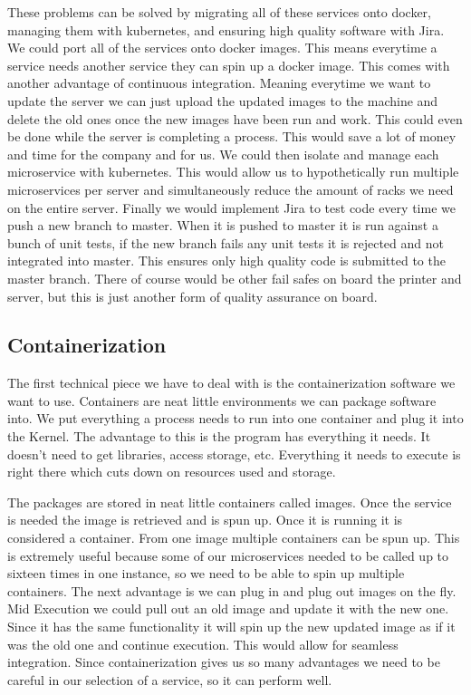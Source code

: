 \documentclass[onecolumn, draftclsnofoot,10pt, compsoc]{IEEEtran}
\begin{document}
These problems can be solved by migrating all of these services onto docker, managing them with kubernetes, and ensuring high quality software with Jira. We could port all of the services onto docker images. This means everytime a service needs another service they can spin up a docker image. This comes with another advantage of continuous integration. Meaning everytime we want to update the server we can just upload the updated images to the machine and delete the old ones once the new images have been run and work. This could even be done while the server is completing a process. This would save a lot of money and time for the company and for us. We could then isolate and manage each microservice with kubernetes. This would allow us to hypothetically run multiple microservices per server and simultaneously reduce the amount of racks we need on the entire server. Finally we would implement Jira to test code every time we push a new branch to master. When it is pushed to master it is run against a bunch of unit tests, if the new branch fails any unit tests it is rejected and not integrated into master. This ensures only high quality code is submitted to the master branch. There of course would be other fail safes on board the printer and server, but this is just another form of quality assurance on board.

\subsection{Containerization}

The first technical piece we have to deal with is the containerization software we want to use. Containers are neat little environments we can package software into. We put everything a process needs to run into one container and plug it into the Kernel. The advantage to this is the program has everything it needs. It doesn’t need to get libraries, access storage, etc. Everything it needs to execute is right there which cuts down on resources used and storage. 

The packages are stored in neat little containers called images. Once the service is needed the image is retrieved and is spun up. Once it is running it is considered a container. From one image multiple containers can be spun up. This is extremely useful because some of our microservices needed to be called up to sixteen times in one instance, so we need to be able to spin up multiple containers. The next advantage is we can plug in and plug out images on the fly. Mid Execution we could pull out an old image and update it with the new one. Since it has the same functionality it will spin up the new updated image as if it was the old one and continue execution. This would allow for seamless integration. Since containerization gives us so many advantages we need to be careful in our selection of a service, so it can perform well.
\end{document}
